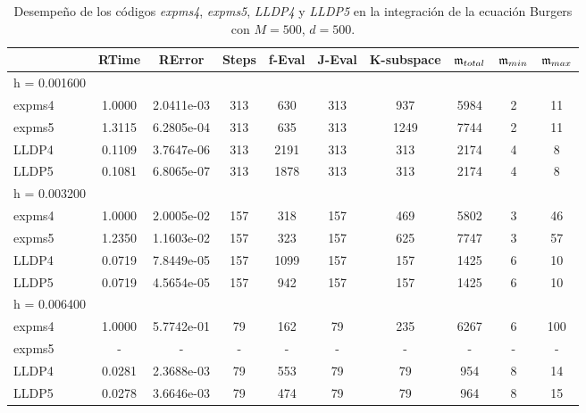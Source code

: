 \begin{table}[h]
	\caption{Desempeño de los códigos \emph{expms4}, \emph{expms5}, \emph{LLDP4} y \emph{LLDP5} en la integración de la ecuación Burgers con $M=500$, $d=500$.}
	\centering
	\begin{tabular}{lccccccccc}
		\hline
		& RTime & RError & Steps & f-Eval & J-Eval & K-subspace & $\mathfrak{m}_{total}$ & $\mathfrak{m}_{min}$ & $\mathfrak{m}_{max}$ \\
		\hline
		h = 0.001600 &  &  &  &  &  &  &  &  &  \\
		expms4 & 1.0000 & 2.0411e-03 & 313 & 630 & 313 & 937 & 5984 & 2 & 11  \\
		expms5 & 1.3115 & 6.2805e-04 & 313 & 635 & 313 & 1249 & 7744 & 2 & 11  \\
		LLDP4 & 0.1109 & 3.7647e-06 & 313 & 2191 & 313 & 313 & 2174 & 4 & 8  \\
		LLDP5 & 0.1081 & 6.8065e-07 & 313 & 1878 & 313 & 313 & 2174 & 4 & 8  \\
		\hline
		h = 0.003200 &  &  &  &  &  &  &  &  &  \\
		expms4 & 1.0000 & 2.0005e-02 & 157 & 318 & 157 & 469 & 5802 & 3 & 46  \\
		expms5 & 1.2350 & 1.1603e-02 & 157 & 323 & 157 & 625 & 7747 & 3 & 57  \\
		LLDP4 & 0.0719 & 7.8449e-05 & 157 & 1099 & 157 & 157 & 1425 & 6 & 10  \\
		LLDP5 & 0.0719 & 4.5654e-05 & 157 & 942 & 157 & 157 & 1425 & 6 & 10  \\
		\hline
		h = 0.006400 &  &  &  &  &  &  &  &  &  \\
		expms4 & 1.0000 & 5.7742e-01 & 79 & 162 & 79 & 235 & 6267 & 6 & 100  \\
		expms5 & - & - & - & - & - & - &- & - & -\\
		LLDP4 & 0.0281 & 2.3688e-03 & 79 & 553 & 79 & 79 & 954 & 8 & 14  \\
		LLDP5 & 0.0278 & 3.6646e-03 & 79 & 474 & 79 & 79 & 964 & 8 & 15  \\
		\hline
	\end{tabular}
	\label{tab:num-exp-lldp-fix-step:bgna}
\end{table}


